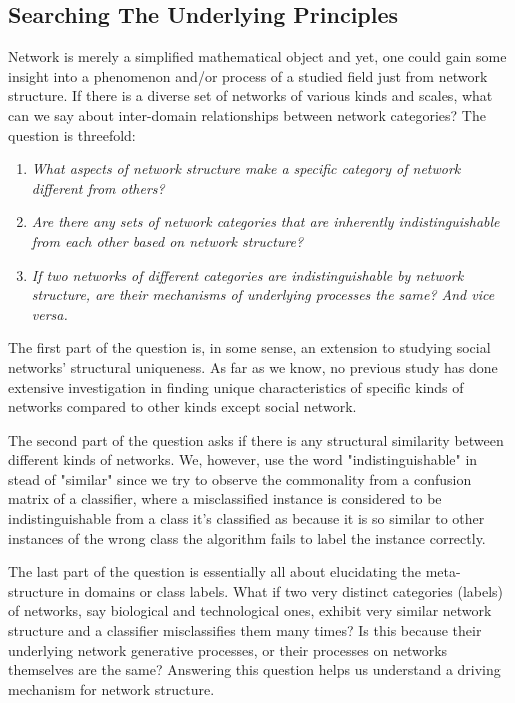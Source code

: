 \documentclass{article}
\begin{document}
	\subsection{Searching The Underlying Principles}
Network is merely a simplified mathematical object and yet, one could gain some insight into a phenomenon and/or process of a studied field just from network structure. 
If there is a diverse set of networks of various kinds and scales, what can we say about inter-domain relationships between network categories? The question is threefold: 
\begin{enumerate}
	\item \textit{What aspects of network structure make a specific category of network different from others?}
	\item \textit{Are there any sets of network categories that are inherently indistinguishable from each other based on network structure?} 
	\item \textit{If two networks of different categories are indistinguishable by network structure, are their mechanisms of underlying processes the same? And vice versa.}
\end{enumerate}

The first part of the question is, in some sense, an extension to studying social networks' structural uniqueness. As far as we know, no previous study has done extensive investigation in finding unique characteristics of specific kinds of networks compared to other kinds except social network.

The second part of the question asks if there is any structural similarity between different kinds of networks. We, however, use the word "indistinguishable" in stead of "similar" since we try to observe the commonality from a confusion matrix of a classifier, where a misclassified instance is considered to be indistinguishable from a class it's classified as because it is so similar to other instances of the wrong class the algorithm fails to label the instance correctly.


The last part of the question is essentially all about elucidating the meta-structure in domains or class labels. What if two very distinct categories (labels) of networks, say biological and technological ones, exhibit very similar network structure and a classifier misclassifies them many times? Is this because their underlying network generative processes, or their processes on networks themselves are the same? Answering this question helps us understand a driving mechanism for network structure.
\end{document}

